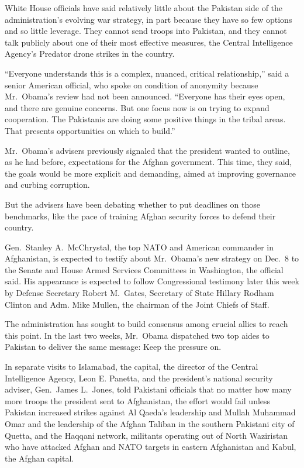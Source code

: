 ﻿\documentclass[12pt]{article}
\begin{document}
White House officials have said relatively little about the Pakistan side of the administration's
evolving war strategy, in part because they have so few options and so little leverage. They cannot
send troops into Pakistan, and they cannot talk publicly about one of their most effective measures,
the Central Intelligence Agency's Predator drone strikes in the country.

``Everyone understands this is a complex, nuanced, critical relationship,'' said a senior American
official, who spoke on condition of anonymity because Mr.~Obama's review had not been announced.
``Everyone has their eyes open, and there are genuine concerns. But one focus now is on trying to
expand cooperation. The Pakistanis are doing some positive things in the tribal areas. That presents
opportunities on which to build.''

Mr.~Obama's advisers previously signaled that the president wanted to outline, as he had before,
expectations for the Afghan government. This time, they said, the goals would be more explicit and
demanding, aimed at improving governance and curbing corruption.

But the advisers have been debating whether to put deadlines on those benchmarks, like the pace of
training Afghan security forces to defend their country.

Gen.~Stanley A.~McChrystal, the top NATO and American commander in Afghanistan, is expected to
testify about Mr.~Obama's new strategy on Dec.~8 to the Senate and House Armed Services Committees
in Washington, the official said. His appearance is expected to follow Congressional testimony later
this week by Defense Secretary Robert M.~Gates, Secretary of State Hillary Rodham Clinton and Adm.
Mike Mullen, the chairman of the Joint Chiefs of Staff.

The administration has sought to build consensus among crucial allies to reach this point. In the
last two weeks, Mr.~Obama dispatched two top aides to Pakistan to deliver the same message: Keep the
pressure on.

In separate visits to Islamabad, the capital, the director of the Central Intelligence Agency, Leon
E. Panetta, and the president's national security adviser, Gen.~James L.~Jones, told Pakistani
officials that no matter how many more troops the president sent to Afghanistan, the effort would
fail unless Pakistan increased strikes against Al Qaeda's leadership and Mullah Muhammad Omar and
the leadership of the Afghan Taliban in the southern Pakistani city of Quetta, and the Haqqani
network, militants operating out of North Waziristan who have attacked Afghan and NATO targets in
eastern Afghanistan and Kabul, the Afghan capital.
\end{document}
